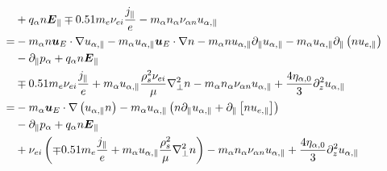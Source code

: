 \begin{align*}
    &
    + q_\alpha n\boldsymbol{E}_\|
    \mp 0.51m_e \nu_{ei}\frac{j_\|}{e}
    - m_\alpha n_\alpha \nu_{\alpha n}u_{\alpha,\|}
    \\
    =&
    - m_\alpha n \boldsymbol{u}_E \cdot \nabla u_{\alpha,\|}
    - m_\alpha u_{\alpha,\|} \boldsymbol{u}_E\cdot \nabla n
    - m_\alpha n u_{\alpha, \|}\partial_\| u_{\alpha,\|}
    - m_\alpha u_{\alpha,\|} \partial_\|\left(n u_{e,\|} \right)
    \\
    &
    - \partial_\| p_\alpha
    + q_\alpha n\boldsymbol{E}_\|
    \\
    &
    \mp 0.51m_e \nu_{ei}\frac{j_\|}{e}
    + m_\alpha u_{\alpha,\|} \frac{\rho_s^2\nu_{ei}}{\mu} \nabla_\perp^2 n
    - m_\alpha n_\alpha \nu_{\alpha n}u_{\alpha,\|}
    + \frac{4\eta_{\alpha,0}}{3} \partial_z^2 u_{\alpha,\|}
    \\
    =&
    - m_\alpha \boldsymbol{u}_E \cdot \nabla\left( u_{\alpha,\|} n \right)
    - m_\alpha u_{\alpha, \|}
    \left(
    n \partial_\| u_{\alpha,\|}
    + \partial_\|\left[n u_{e,\|} \right]
    \right)
    \\
    &
    - \partial_\| p_\alpha
    + q_\alpha n\boldsymbol{E}_\|
    \\
    &
    + \nu_{ei}
    \left(
    \mp 0.51m_e \frac{j_\|}{e}
    + m_\alpha u_{\alpha,\|} \frac{\rho_s^2}{\mu} \nabla_\perp^2 n
    \right)
    - m_\alpha n_\alpha \nu_{\alpha n}u_{\alpha,\|}
    + \frac{4\eta_{\alpha,0}}{3} \partial_z^2 u_{\alpha,\|}
\end{align*}

